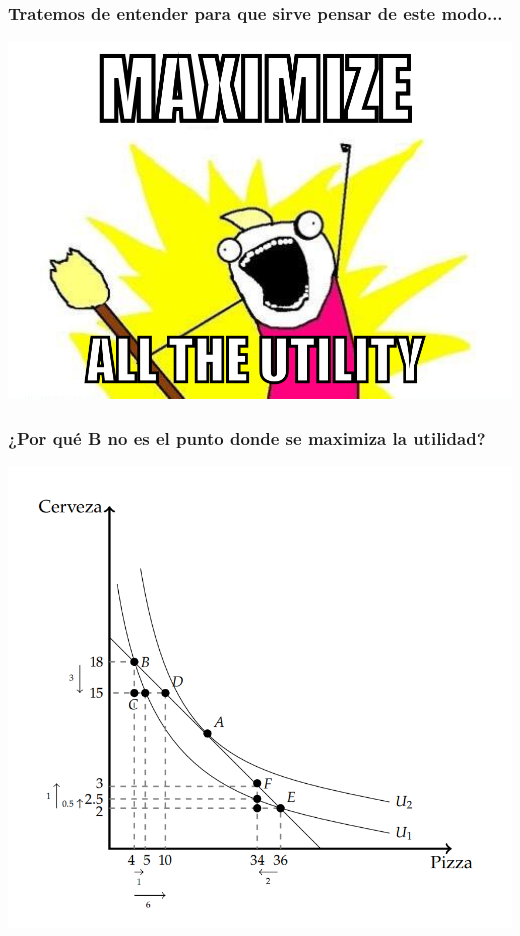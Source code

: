 \documentclass{beamer}
\begin{document}
\begin{frame}
\frametitle{Tratemos de entender para que sirve pensar de este modo...}
\centering
\includegraphics[scale=0.5]{../Figures/Tema_02.23_rp21.png}
\end{frame}

\begin{frame}
\frametitle{¿Por qué B no es el punto donde se maximiza la utilidad?}
\centering
\includegraphics[scale=0.6]{../Figures/C8.3.png}
\end{frame}
\end{document}
